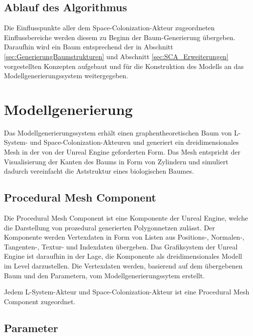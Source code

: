 \subsection{Ablauf des Algorithmus}

Die Einflusspunkte aller dem Space-Colonization-Akteur zugeordneten Einflussbereiche werden diesem zu Beginn der Baum-Generierung übergeben. Daraufhin wird ein Baum entsprechend der in Abschnitt \ref{sec:GenerierungBaumstrukturen} und Abschnitt \ref{sec:SCA_Erweiterungen} vorgestellten Konzepten aufgebaut und für die Konstruktion des Modells an das Modellgenerierungssystem weitergegeben.

\section{Modellgenerierung} \label{sec:Modellgenerierung}

Das Modellgenerierungssystem erhält einen graphentheoretischen Baum von L-System- und Space-Colonization-Akteuren und generiert ein dreidimensionales Mesh in der von der Unreal Engine geforderten Form. Das Mesh entspricht der Visualisierung der Kanten des Baums in Form von Zylindern und simuliert dadurch vereinfacht die Aststruktur eines biologischen Baumes. \cite[Abschn. 2]{SpaceColonizationAlgorithm:07} 

\subsection{Procedural Mesh Component}

Die Procedural Mesh Component ist eine Komponente der Unreal Engine, welche die Darstellung von prozedural generierten Polygonnetzen zulässt. Der Komponente werden Vertexdaten in Form von Listen aus Positions-, Normalen-, Tangenten-, Textur- und Indexdaten übergeben. Das Grafiksystem der Unreal Engine ist daraufhin in der Lage, die Komponente als dreidimensionales Modell im Level darzustellen. \cite{ProceduralMeshComponent:15} Die Vertexdaten werden, basierend auf dem übergebenen Baum und den Parametern, vom Modellgenerierungssytem erstellt.

Jedem L-System-Akteur und Space-Colonization-Akteur ist eine Procedural Mesh Component zugeordnet.

\subsection{Parameter} \label{subsec:Modellgenerierung_Parameter}

